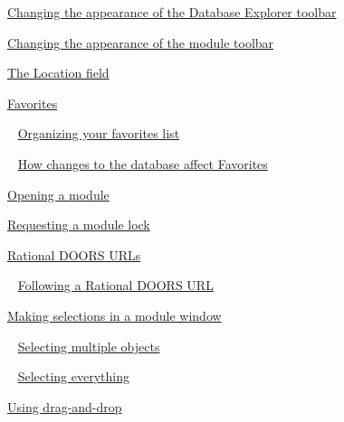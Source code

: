 \documentclass[11pt,a4paper]{article}
\begin{document}
\href{https://www.ibm.com/support/knowledgecenter/search/Changing%20the%20appearance%20of%20the%20Database%20Explorer%20toolbar?scope=SSYQBZ_9.6.1}{Changing the appearance of the Database Explorer toolbar}

\href{https://www.ibm.com/support/knowledgecenter/search/Changing%20the%20appearance%20of%20the%20module%20toolbar?scope=SSYQBZ_9.6.1}{Changing the appearance of the module toolbar}

\href{https://www.ibm.com/support/knowledgecenter/search/The%20Location%20field?scope=SSYQBZ_9.6.1}{The Location field}

\href{https://www.ibm.com/support/knowledgecenter/search/Favorites?scope=SSYQBZ_9.6.1}{Favorites}

\,\,\, \href{https://www.ibm.com/support/knowledgecenter/search/Organizing%20your%20favorites%20list?scope=SSYQBZ_9.6.1}{Organizing your favorites list}

\,\,\, \href{https://www.ibm.com/support/knowledgecenter/search/How%20changes%20to%20the%20database%20affect%20Favorites?scope=SSYQBZ_9.6.1}{How changes to the database affect Favorites}

\href{https://www.ibm.com/support/knowledgecenter/search/Opening%20a%20module?scope=SSYQBZ_9.6.1}{Opening a module}

\href{https://www.ibm.com/support/knowledgecenter/search/Requesting%20a%20module%20lock?scope=SSYQBZ_9.6.1}{Requesting a module lock}

\href{https://www.ibm.com/support/knowledgecenter/search/Rational%20DOORS%20URLs?scope=SSYQBZ_9.6.1}{Rational DOORS URLs}

\,\,\, \href{https://www.ibm.com/support/knowledgecenter/search/Following%20a%20Rational%20DOORS%20URL?scope=SSYQBZ_9.6.1}{Following a Rational DOORS URL}

\href{https://www.ibm.com/support/knowledgecenter/search/Making%20selections%20in%20a%20module%20window?scope=SSYQBZ_9.6.1}{Making selections in a module window}

\,\,\, \href{https://www.ibm.com/support/knowledgecenter/search/Selecting%20multiple%20objects?scope=SSYQBZ_9.6.1}{Selecting multiple objects}

\,\,\, \href{https://www.ibm.com/support/knowledgecenter/search/Selecting%20everything?scope=SSYQBZ_9.6.1}{Selecting everything}

\href{https://www.ibm.com/support/knowledgecenter/search/Using%20drag-and-drop?scope=SSYQBZ_9.6.1}{Using drag-and-drop}
\end{document}
